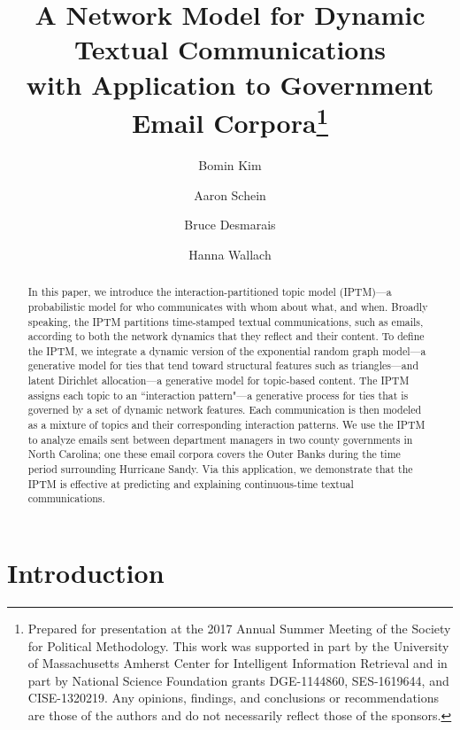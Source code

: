 \documentclass[a4paper]{article}
\title{A Network Model for Dynamic Textual Communications \\with Application to
	Government Email Corpora\footnote{\noindent Prepared for presentation at the 2017 Annual Summer Meeting of the Society for Political Methodology. This work was supported in part by the University of Massachusetts Amherst Center for Intelligent Information Retrieval and in part by National Science Foundation grants DGE-1144860, SES-1619644, and CISE-1320219. Any opinions, findings, and conclusions or recommendations are those of the authors and do not necessarily reflect those of the sponsors. }}
\author[1]{Bomin Kim}
\author[3]{Aaron Schein}
\author[1]{Bruce Desmarais}
\author[2,3]{Hanna Wallach}
\affil[1]{Pennsylvania State University}
\affil[2]{Microsoft Research NYC}
\affil[3]{University of Massachusetts Amherst}
\begin{document}
\setlength{\parindent}{0pt}
\maketitle
\begin{abstract}
	
	\noindent In this paper, we introduce the interaction-partitioned topic model
	(IPTM)---a probabilistic model for who communicates with whom about
	what, and when. Broadly speaking, the IPTM partitions time-stamped
	textual communications, such as emails, according to both the network
	dynamics that they reflect and their content. To define the IPTM, we
	integrate a dynamic version of the exponential random graph model---a
	generative model for ties that tend toward structural features such as
	triangles---and latent Dirichlet allocation---a generative model for
	topic-based content. The IPTM assigns each topic to an ``interaction
	pattern"---a generative process for ties that is governed by a set of
	dynamic network features. Each communication is then modeled as a
	mixture of topics and their corresponding interaction patterns. We use
	the IPTM to analyze emails sent between department managers in two
	county governments in North Carolina; one these email corpora
	covers the Outer Banks during the time period surrounding Hurricane
	Sandy. Via this application, we demonstrate that the IPTM is effective
	at predicting and explaining continuous-time textual communications.
\end{abstract}
\section{Introduction} \label{sec: Introduction}
\end{document}
